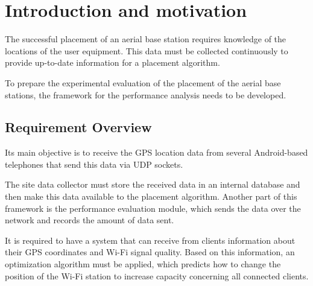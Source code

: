
\section{Introduction and motivation}\label{introduction-and-motivation}


The successful placement of an aerial base station requires knowledge of
the locations of the user equipment. This data must be collected
continuously to provide up-to-date information for a placement
algorithm.

To prepare the experimental evaluation of the placement of the aerial
base stations, the framework for the performance analysis needs to be
developed.

\subsection{Requirement Overview}\label{requirement-overview}

Its main objective is to receive the GPS location data from several
Android-based telephones that send this data via UDP sockets.

The site data collector must store the received data in an internal
database and then make this data available to the placement algorithm.
Another part of this framework is the performance evaluation module,
which sends the data over the network and records the amount of data
sent.

It is required to have a system that can receive from clients
information about their GPS coordinates and Wi-Fi signal quality. Based
on this information, an optimization algorithm must be applied, which
predicts how to change the position of the Wi-Fi station to increase
capacity concerning all connected clients.

\newpage